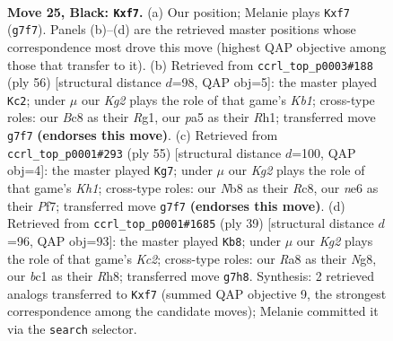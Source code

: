 \documentclass[11pt]{article}
\begin{document}
\clearpage

\begin{figure}[p]\centering
\begin{subfigure}{0.46\textwidth}\centering
\resizebox{\linewidth}{!}{%
\newchessgame
\chessboard[
  setfen={rnbr1b2/ppp1pBk1/4Nn2/P1P5/8/6R1/1P3P2/RNB1K3 b Q - 8 25},
  showmover=false,
  pgfstyle=straightmove, color=movearrow, markmove={g7-f7}
]}
\caption{}
\end{subfigure}\hfill
\begin{subfigure}{0.46\textwidth}\centering
\resizebox{\linewidth}{!}{%
\newchessgame
\chessboard[
  setfen={r7/1kp1r1b1/1p3n2/3Pn1p1/2P3p1/1P2P3/1B2B3/1KN3RR w - - 0 29},
  showmover=false,
  pgfstyle=straightmove, color=movearrow, markmove={b1-c2}
]}
\caption{}
\end{subfigure}
\\[4pt]
\begin{subfigure}{0.46\textwidth}\centering
\resizebox{\linewidth}{!}{%
\newchessgame
\chessboard[
  setfen={2rr3k/pp3p1N/2b2p2/3n4/P1pP3P/4P3/1PB3P1/4RRK1 b - - 2 28},
  showmover=false,
  pgfstyle=straightmove, color=movearrow, markmove={h8-g7}
]}
\caption{}
\end{subfigure}\hfill
\begin{subfigure}{0.46\textwidth}\centering
\resizebox{\linewidth}{!}{%
\newchessgame
\chessboard[
  setfen={5bnr/2k2ppp/8/pN2p2b/B3p3/r3PP2/6PP/2R1K1NR b K - 1 20},
  showmover=false,
  pgfstyle=straightmove, color=movearrow, markmove={c7-b8}
]}
\caption{}
\end{subfigure}
\caption{\textbf{Move 25, Black: \texttt{Kxf7}.} (a) Our position; Melanie plays \texttt{Kxf7} (\texttt{g7f7}). Panels (b)--(d) are the retrieved master positions whose correspondence most drove this move (highest QAP objective among those that transfer to it). (b) Retrieved from \texttt{ccrl\_top\_p0003\#188} (ply 56) [structural distance $d$=98, QAP obj=5]: the master played \texttt{Kc2}; under $\mu$ our \emph{Kg2} plays the role of that game's \emph{Kb1}; cross-type roles: our \emph{B}c8 as their \emph{R}g1, our \emph{p}a5 as their \emph{R}h1; transferred move \texttt{g7f7} \textbf{(endorses this move)}. (c) Retrieved from \texttt{ccrl\_top\_p0001\#293} (ply 55) [structural distance $d$=100, QAP obj=4]: the master played \texttt{Kg7}; under $\mu$ our \emph{Kg2} plays the role of that game's \emph{Kh1}; cross-type roles: our \emph{N}b8 as their \emph{R}c8, our \emph{n}e6 as their \emph{P}f7; transferred move \texttt{g7f7} \textbf{(endorses this move)}. (d) Retrieved from \texttt{ccrl\_top\_p0001\#1685} (ply 39) [structural distance $d$=96, QAP obj=93]: the master played \texttt{Kb8}; under $\mu$ our \emph{Kg2} plays the role of that game's \emph{Kc2}; cross-type roles: our \emph{R}a8 as their \emph{N}g8, our \emph{b}c1 as their \emph{R}h8; transferred move \texttt{g7h8}. Synthesis: 2 retrieved analogs transferred to \texttt{Kxf7} (summed QAP objective 9, the strongest correspondence among the candidate moves); Melanie committed it via the \texttt{search} selector.}
\label{fig:thought-m49}
\end{figure}
\end{document}
